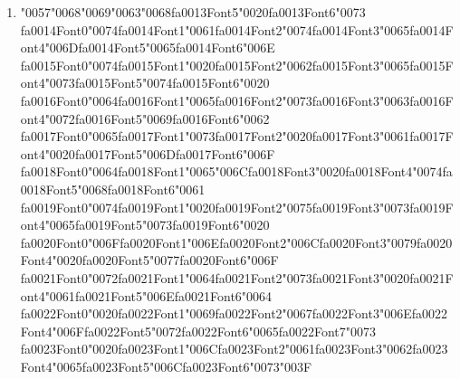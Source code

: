 \documentclass[11pt]{article}
\begin{document}
\begin{enumerate}[leftmargin=*]
  \item {\char"0057}{\char"0068}{\char"0069}{\char"0063}{\char"0068}{\csname fa0013Font5\endcsname\char"0020}{\csname fa0013Font6\endcsname\char"0073} {\csname fa0014Font0\endcsname\char"0074}{\csname fa0014Font1\endcsname\char"0061}{\csname fa0014Font2\endcsname\char"0074}{\csname fa0014Font3\endcsname\char"0065}{\csname fa0014Font4\endcsname\char"006D}{\csname fa0014Font5\endcsname\char"0065}{\csname fa0014Font6\endcsname\char"006E} {\csname fa0015Font0\endcsname\char"0074}{\csname fa0015Font1\endcsname\char"0020}{\csname fa0015Font2\endcsname\char"0062}{\csname fa0015Font3\endcsname\char"0065}{\csname fa0015Font4\endcsname\char"0073}{\csname fa0015Font5\endcsname\char"0074}{\csname fa0015Font6\endcsname\char"0020} {\csname fa0016Font0\endcsname\char"0064}{\csname fa0016Font1\endcsname\char"0065}{\csname fa0016Font2\endcsname\char"0073}{\csname fa0016Font3\endcsname\char"0063}{\csname fa0016Font4\endcsname\char"0072}{\csname fa0016Font5\endcsname\char"0069}{\csname fa0016Font6\endcsname\char"0062} {\csname fa0017Font0\endcsname\char"0065}{\csname fa0017Font1\endcsname\char"0073}{\csname fa0017Font2\endcsname\char"0020}{\csname fa0017Font3\endcsname\char"0061}{\csname fa0017Font4\endcsname\char"0020}{\csname fa0017Font5\endcsname\char"006D}{\csname fa0017Font6\endcsname\char"006F} {\csname fa0018Font0\endcsname\char"0064}{\csname fa0018Font1\endcsname\char"0065}{\char"006C}{\csname fa0018Font3\endcsname\char"0020}{\csname fa0018Font4\endcsname\char"0074}{\csname fa0018Font5\endcsname\char"0068}{\csname fa0018Font6\endcsname\char"0061} {\csname fa0019Font0\endcsname\char"0074}{\csname fa0019Font1\endcsname\char"0020}{\csname fa0019Font2\endcsname\char"0075}{\csname fa0019Font3\endcsname\char"0073}{\csname fa0019Font4\endcsname\char"0065}{\csname fa0019Font5\endcsname\char"0073}{\csname fa0019Font6\endcsname\char"0020} {\csname fa0020Font0\endcsname\char"006F}{\csname fa0020Font1\endcsname\char"006E}{\csname fa0020Font2\endcsname\char"006C}{\csname fa0020Font3\endcsname\char"0079}{\csname fa0020Font4\endcsname\char"0020}{\csname fa0020Font5\endcsname\char"0077}{\csname fa0020Font6\endcsname\char"006F} {\csname fa0021Font0\endcsname\char"0072}{\csname fa0021Font1\endcsname\char"0064}{\csname fa0021Font2\endcsname\char"0073}{\csname fa0021Font3\endcsname\char"0020}{\csname fa0021Font4\endcsname\char"0061}{\csname fa0021Font5\endcsname\char"006E}{\csname fa0021Font6\endcsname\char"0064} {\csname fa0022Font0\endcsname\char"0020}{\csname fa0022Font1\endcsname\char"0069}{\csname fa0022Font2\endcsname\char"0067}{\csname fa0022Font3\endcsname\char"006E}{\csname fa0022Font4\endcsname\char"006F}{\csname fa0022Font5\endcsname\char"0072}{\csname fa0022Font6\endcsname\char"0065}{\csname fa0022Font7\endcsname\char"0073} {\csname fa0023Font0\endcsname\char"0020}{\csname fa0023Font1\endcsname\char"006C}{\csname fa0023Font2\endcsname\char"0061}{\csname fa0023Font3\endcsname\char"0062}{\csname fa0023Font4\endcsname\char"0065}{\csname fa0023Font5\endcsname\char"006C}{\csname fa0023Font6\endcsname\char"0073}{\char"003F}

\end{enumerate}
\end{document}
